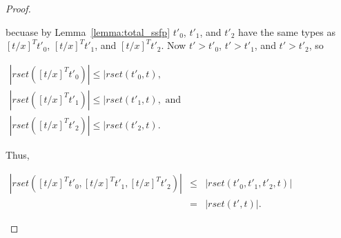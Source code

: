 \begin{proof}
\begin{itemize}
\begin{center}
  \end{center}
  becuase by Lemma~\ref{lemma:total_ssfp} $t'_0$, $t'_1$, and $t'_2$ have the same types as $[t/x]^T t'_0$, $[t/x]^T t'_1$, and $[t/x]^T t'_2$.
  Now $t' > t'_0$, $t' > t'_1$, and $t' > t'_2$, so 
  \begin{center}
    \begin{math}
      \begin{array}{lll}
        |rset([t/x]^T t'_0)| \leq |rset(t'_0, t),\\
        |rset([t/x]^T t'_1)| \leq |rset(t'_1, t), \text{ and }\\
        |rset([t/x]^T t'_2)| \leq |rset(t'_2, t).
      \end{array}
    \end{math}
  \end{center}
  Thus, 
  \begin{center}
    \begin{math}
      \begin{array}{lll}
        |rset([t/x]^T t'_0, [t/x]^T t'_1, [t/x]^T t'_2)| & \leq & |rset(t'_0,t'_1,t'_2,t)|\\
        & =    & |rset(t',t)|.
      \end{array}
    \end{math}
  \end{center}
  

\end{itemize}
\end{proof}
